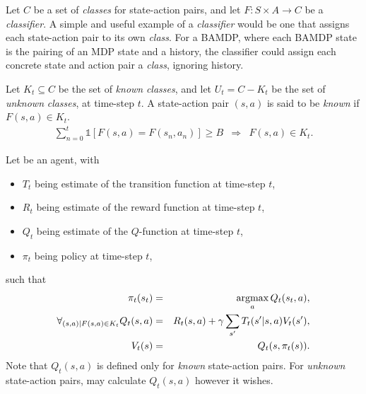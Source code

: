 \begin{defn}
Let $C$ be a set of \emph{classes} for state-action pairs, and let $F:S\times A\rightarrow C$ be a \emph{classifier}. A simple and useful example of a \emph{classifier} would be one that assigns each state-action pair to its own \emph{class}. For a BAMDP, where each BAMDP state is the pairing of an MDP state and a history, the classifier could assign each concrete state and action pair a \emph{class}, ignoring history.
\end{defn}

\begin{defn}
Let $K_t \subseteq C$ be the set of \emph{known} \emph{classes}, and let $U_t = C - K_t$ be the set of \emph{unknown} \emph{classes}, at time-step $t$. A state-action pair $(s,a)$ is said to be \emph{known} if $F(s,a) \in K_t$.
\begin{eqnarray}
\sum_{n=0}^t \mathbb{1}\left[F(s,a) = F(s_n,a_n)\right] \geq B & \Longrightarrow & F(s,a) \in K_t.
\end{eqnarray}
\end{defn}

\begin{defn}
Let \A be an agent, with
\begin{itemize}
\item
$T_t$ being \As estimate of the transition function at time-step $t$,
\item
$R_t$ being \As estimate of the reward function at time-step $t$,
\item
$Q_t$ being \As estimate of the $Q$-function at time-step $t$,
\item
$\pi_t$ being \As policy at time-step $t$, 
\end{itemize}
such that
\begin{eqnarray}
\pi_t(s_t) &=& \argmax_a Q_t(s_t,a),\\
\forall_{(s,a) | F(s,a)\in K_t} Q_t(s,a) &=& R_t(s,a) + \gamma \sum_{s'} T_t(s'|s,a) V_t(s'),\\
V_t(s) &=& Q_t(s,\pi_t(s)).
\end{eqnarray}
Note that $Q_t(s,a)$ is defined only for \emph{known} state-action pairs. For \emph{unknown} state-action pairs, \A may calculate $Q_t(s,a)$ however it wishes.
\end{defn}

